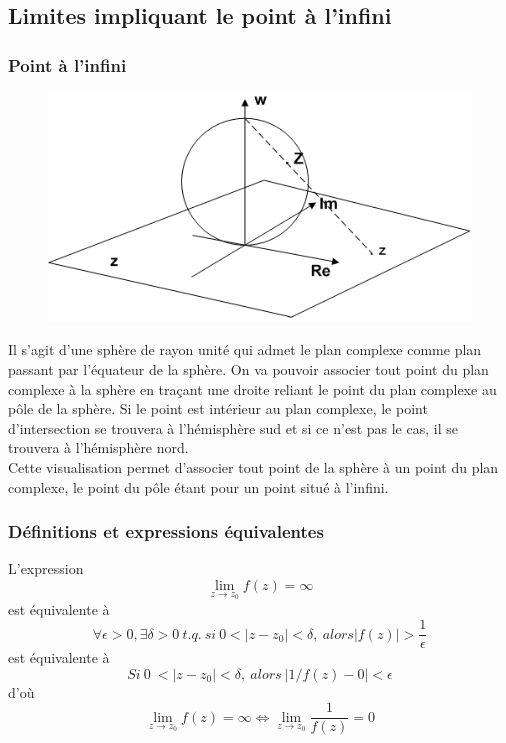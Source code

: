     \subsection{Limites impliquant le point à l'infini}
        \subsubsection{Point à l'infini}
        \begin{figure}
        \includegraphics[scale=0.2]{ch1/image1.png}
        \end{figure}
        Il s'agit d'une sphère de rayon unité qui admet le plan complexe comme plan passant par
        l'équateur de la sphère. On va pouvoir associer tout point du plan complexe à la sphère 
        en traçant une droite reliant le point du plan complexe au pôle de la sphère. Si le point
        est intérieur au plan complexe, le point d'intersection se trouvera à l'hémisphère sud et si ce n'est
        pas le cas, il se trouvera à l'hémisphère nord.\\
        
        Cette visualisation permet d'associer tout point de la sphère à un point du plan complexe, le
        point du pôle étant pour un point situé à l'infini.
        
        
        \subsubsection{Définitions et expressions équivalentes}
        L'expression 
        \begin{equation}
        \lim\limits_{z\rightarrow z_0} f(z) = \infty
        \end{equation}
        est équivalente à 
        \begin{equation}
        \forall \epsilon > 0, \exists \delta > 0\ t.q.\ si\ 0 < |z-z_0| < \delta,\ alors |f(z)| > \frac{1}{\epsilon}
        \end{equation}
        est équivalente à
        \begin{equation}
        Si\ 0\ < |z-z_0| < \delta,\ alors\ |1/f(z) - 0| < \epsilon
        \end{equation}
        d'où
        \begin{equation}
        \lim\limits_{z\rightarrow z_0} f(z) = \infty \Leftrightarrow \lim\limits_{z\rightarrow z_0} \frac{1}{f(z)} = 0
        \end{equation}
        
